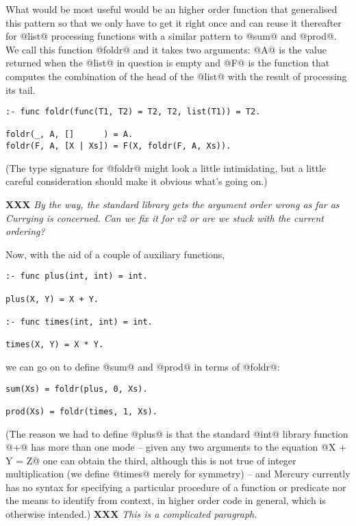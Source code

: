 \documentclass[a4paper,11pt,notitlepage,onecolumn]{article}
\newcommand{\XXX}[1]%
{{\small\textbf{XXX} \emph{#1}}}
\begin{document}
What would be most useful would be an higher order function that
generalised this pattern so that we only have to get it right once and
can reuse it thereafter for @list@ processing functions with a similar
pattern to @sum@ and @prod@.  We call this function @foldr@ and it takes
two arguments: @A@ is the value returned when the @list@ in question is
empty and @F@ is the function that computes the combination of the head
of the @list@ with the result of processing its tail.
\begin{verbatim}
:- func foldr(func(T1, T2) = T2, T2, list(T1)) = T2.

foldr(_, A, []      ) = A.
foldr(F, A, [X | Xs]) = F(X, foldr(F, A, Xs)).
\end{verbatim}
(The type signature for @foldr@ might look a little intimidating, but a
little careful consideration should make it obvious what's going on.)

\XXX{By the way, the standard library gets the argument order wrong as
far as Currying is concerned.  Can we fix it for v2 or are we stuck with
the current ordering?}

Now, with the aid of a couple of auxiliary functions,
\begin{verbatim}
:- func plus(int, int) = int.

plus(X, Y) = X + Y.

:- func times(int, int) = int.

times(X, Y) = X * Y.
\end{verbatim}
we can go on to define @sum@ and @prod@ in terms of @foldr@:
\begin{verbatim}
sum(Xs) = foldr(plus, 0, Xs).

prod(Xs) = foldr(times, 1, Xs).
\end{verbatim}
(The reason we had to define @plus@ is that the standard @int@ library
function @+@ has more than one mode -- given any two arguments to the
equation @X + Y = Z@ one can obtain the third, although this is not true
of integer multiplication (we define @times@ merely for symmetry) -- and
Mercury currently has no syntax for specifying a particular procedure of
a function or predicate nor the means to identify from context, in
higher order code in general, which is otherwise intended.) \XXX{This is
a complicated paragraph.}
\end{document}
